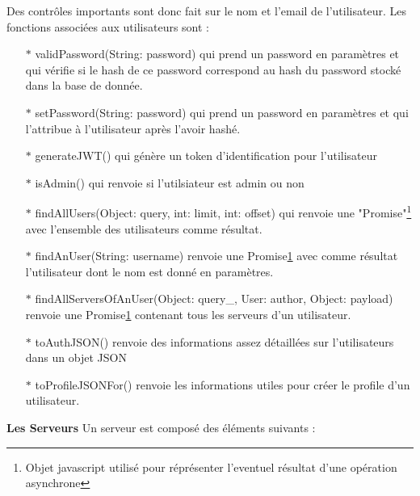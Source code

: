 \documentclass{article}
\begin{document}
Des contrôles importants sont donc fait sur le nom et l'email de l'utilisateur.
\newline
\newline
Les fonctions associées aux utilisateurs sont :
\begin{itemize}
	\item[$\ast$]validPassword(String: password) qui prend un password en paramètres et qui vérifie si le hash de ce password correspond au hash du password stocké dans la base de donnée.
	\item[$\ast$]setPassword(String: password) qui prend un password en paramètres et qui l'attribue à l'utilisateur après l'avoir hashé.
	\item[$\ast$]generateJWT() qui génère un token d'identification pour l'utilisateur
	\item[$\ast$]isAdmin() qui renvoie si l'utilsiateur est admin ou non
	\item[$\ast$]findAllUsers(Object: query, int: limit, int: offset) qui renvoie une "Promise"\footnote{\label{promise}Objet javascript utilisé pour réprésenter l'eventuel résultat d'une opération asynchrone} avec l'ensemble des utilisateurs comme résultat.
	\item[$\ast$]findAnUser(String: username) renvoie une Promise\ref{promise} avec comme résultat l'utilisateur dont le nom est donné en paramètres.
	\item[$\ast$]findAllServersOfAnUser(Object: query\_, User: author, Object: payload) renvoie une Promise\ref{promise} contenant tous les serveurs d'un utilisateur.
	\item[$\ast$]toAuthJSON() renvoie des informations assez détaillées sur l'utilisateurs dans un objet JSON
	\item[$\ast$]toProfileJSONFor() renvoie les informations utiles pour créer le profile d'un utilisateur.
\end{itemize}
\textbf{Les Serveurs}
\newline
\newline
Un serveur est composé des éléments suivants :
\end{document}
